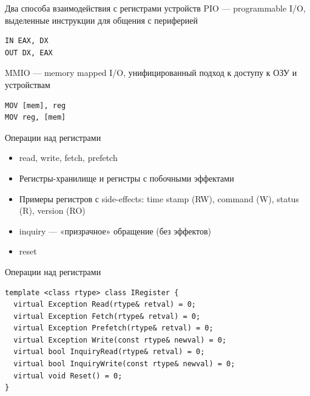 \documentclass{beamer}
\begin{document}
\begin{frame}[fragile]{Два способа взаимодействия с регистрами устройств}
PIO — programmable I/O, выделенные инструкции для общения с периферией

\begin{verbatim}
IN EAX, DX
OUT DX, EAX
\end{verbatim}
\pause

MMIO — memory mapped I/O, унифицированный подход к доступу к ОЗУ и устройствам

\begin{verbatim}
MOV [mem], reg
MOV reg, [mem]
\end{verbatim}

\end{frame}

\begin{frame}{Операции над регистрами}
\begin{itemize}
\item read, write, fetch, prefetch
\item Регистры-хранилище и регистры с побочными эффектами
\item Примеры регистров с side-effects: time stamp (RW), command (W), status (R), version (RO)
\item inquiry — «призрачное» обращение (без эффектов)
\item reset
\end{itemize}

\end{frame}

\begin{frame}[fragile]{Операции над регистрами}
\begin{verbatim}
template <class rtype> class IRegister {
  virtual Exception Read(rtype& retval) = 0;
  virtual Exception Fetch(rtype& retval) = 0;
  virtual Exception Prefetch(rtype& retval) = 0;
  virtual Exception Write(const rtype& newval) = 0;
  virtual bool InquiryRead(rtype& retval) = 0;
  virtual bool InquiryWrite(const rtype& newval) = 0;
  virtual void Reset() = 0;
}
\end{verbatim}
\end{frame}
\end{document}

